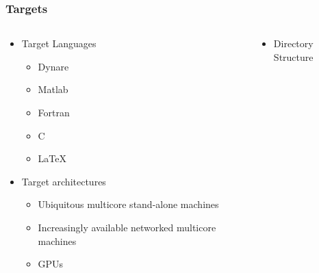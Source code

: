 \documentclass[handout]{beamer}
\begin{document}
\begin{frame}
  \frametitle{Targets}
  \begin{columns}
    \begin{column}{.5\linewidth}
      

  \begin{itemize}
\item Target Languages
    \begin{itemize}
    \item Dynare
    \item Matlab
    \item Fortran
    \item C
    \item \LaTeX
    \end{itemize}
\item Target architectures
  \begin{itemize}
\item Ubiquitous multicore stand-alone machines
  \item Increasingly available networked multicore machines
  \item GPUs
  \end{itemize}


  \end{itemize}
\end{column}
    \begin{column}{.5\linewidth}

      \begin{itemize}
      \item Directory Structure
      \end{itemize}





\end{column}

  \end{columns}


\end{frame}

\end{document}
